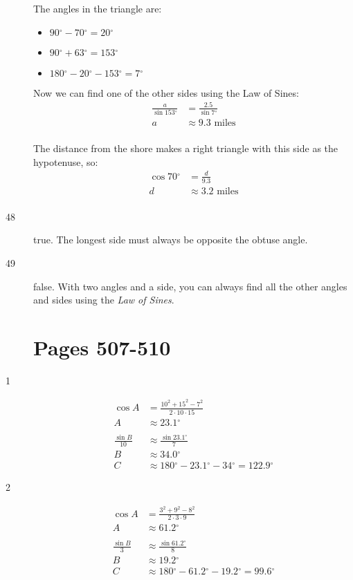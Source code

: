 \documentclass[fleqn,addpoints]{exam}
\newcommand{\degree}{\ensuremath{^\circ}}
\begin{document}
\begin{description}
The angles in the triangle are:
\begin{itemize}
  \item $90 \degree - 70 \degree = 20 \degree$
  \item $90 \degree + 63 \degree = 153 \degree$
  \item $180 \degree - 20 \degree - 153 \degree = 7 \degree$
\end{itemize}

Now we can find one of the other sides using the Law of Sines:
\begin{align*}
  \frac{a}{\sin 153 \degree} &= \frac{2.5}{\sin 7 \degree} \\
  a &\approx 9.3 \text{ miles}\\
\end{align*}

The distance from the shore makes a right triangle with this side as the hypotenuse, so:
\begin{align*}
  \cos 70 \degree &= \frac{d}{9.3} \\
  d &\approx 3.2 \text{ miles} \\
\end{align*}

\item[48]
true.  The longest side must always be opposite the obtuse angle.

\item[49]
false.  With two angles and a side, you can always find all the other angles and sides using the {\em Law of Sines}. 

\section{Pages 507-510}

\item[1]
\begin{align*}
  \cos A &= \frac{10^2 + 15^2 - 7^2}{2 \cdot 10 \cdot 15} \\
  A &\approx 23.1 \degree \\
  \\
  \frac{\sin B}{10} &\approx \frac{\sin 23.1 \degree}{7} \\
  B &\approx 34.0 \degree
  \\
  C &\approx 180 \degree - 23.1 \degree - 34 \degree = 122.9 \degree
\end{align*}

\item[2]
\begin{align*}
  \cos A &= \frac{3^2 + 9^2 - 8^2}{2 \cdot 3 \cdot 9} \\
  A &\approx 61.2 \degree \\
  \\
  \frac{\sin B}{3} &\approx \frac{\sin 61.2 \degree}{8} \\
  B &\approx 19.2 \degree
  \\
  C &\approx 180 \degree - 61.2 \degree - 19.2 \degree = 99.6 \degree
\end{align*}


\end{description}
\end{document}
